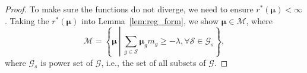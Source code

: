 \begin{proof}
    To make sure the functions do not diverge, we need to ensure $r^*(\bm{\mu})< \infty$. Taking the $r^*(\bm{\mu})$ into Lemma~\ref{lem:reg_form}, we show
    $\bm{\mu}\in\mathcal{M}$, where
    \[
    \mathcal{M}=\left\{\bm{\mu} ~\left|~ \sum_{g\in\mathcal{S}} \bm{\mu}_gm_g \ge -\lambda, \forall \mathcal{S}\in\mathcal{G}_s\right.\right\},
    \]
    where $\mathcal{G}_s$ is power set of $\mathcal{G}$, i.e., the set of all subsets of $\mathcal{G}$.
    


    

    

    
    
    
\end{proof}

